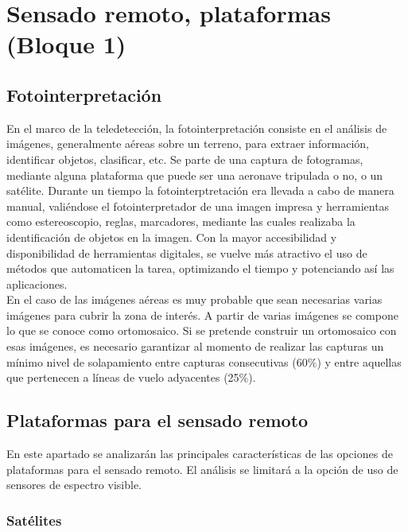 \section{Sensado remoto, plataformas (Bloque 1)}
\subsection{Fotointerpretación}
En el marco de la teledetección, la fotointerpretación consiste en el análisis de imágenes, generalmente aéreas sobre un terreno, para extraer información, identificar objetos, clasificar, etc. Se parte de una captura de fotogramas, mediante alguna plataforma que puede ser una aeronave tripulada o no, o un satélite. Durante un tiempo la fotointerptretación era llevada a cabo de manera manual, valiéndose el fotointerpretador de una imagen impresa y herramientas como estereoscopio, reglas, marcadores, mediante las cuales realizaba la identificación de objetos en la imagen. Con la mayor accesibilidad y disponibilidad de herramientas digitales, se vuelve más atractivo el uso de métodos que automaticen la tarea, optimizando el tiempo y potenciando así las aplicaciones.\\
En el caso de las imágenes aéreas es muy probable que sean necesarias varias imágenes para cubrir la zona de interés. A partir de varias imágenes se compone lo que se conoce como ortomosaico. Si se pretende construir un ortomosaico con esas imágenes, es necesario garantizar al momento de realizar las capturas un mínimo nivel de solapamiento entre capturas consecutivas (60\%) y entre aquellas que pertenecen a líneas de vuelo adyacentes (25\%). \\
\subsection{Plataformas para el sensado remoto}
En este apartado se analizarán las principales características de las opciones de plataformas para el sensado remoto. El análisis se limitará a la opción de uso de sensores de espectro visible.
\subsubsection{Satélites}

